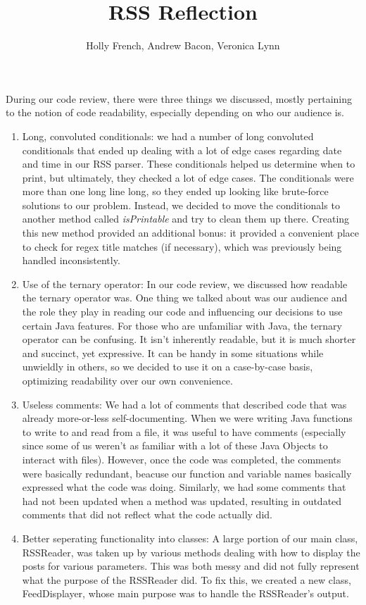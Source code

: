 \documentclass{article}
\title{RSS Reflection}
\author{Holly French, Andrew Bacon, Veronica Lynn}
\date{}
\begin{document}
\maketitle

During our code review, there were three things we discussed, mostly pertaining to the notion of code readability, especially depending on who our audience is.  

\begin{enumerate}
\item Long, convoluted conditionals: we had a number of long convoluted conditionals that ended up dealing with a lot of edge cases regarding date and time in our RSS parser.  These conditionals helped us determine when to print, but ultimately, they checked a lot of edge cases.  The conditionals were more than one long line long, so they ended up looking like brute-force solutions to our problem.  Instead, we decided to move the conditionals to another method called \emph{isPrintable} and try to clean them up there. Creating this new method provided an additional bonus: it provided a convenient place to check for regex title matches (if necessary), which was previously being handled inconsistently.
\item Use of the ternary operator: In our code review, we discussed how readable the ternary operator was.  One thing we talked about was our audience and the role they play in reading our code and influencing our decisions to use certain Java features. For those who are unfamiliar with Java, the ternary operator can be confusing. It isn't inherently readable, but it is much shorter and succinct, yet expressive. It can be handy in some situations while unwieldly in others, so we decided to use it on a case-by-case basis, optimizing readability over our own convenience.
\item Useless comments: We had a lot of comments that described code that was already more-or-less self-documenting.  When we were writing Java functions to write to and read from a file, it was useful to have comments (especially since some of us weren't as familiar with a lot of these Java Objects to interact with files).  However, once the code was completed, the comments were basically redundant, beacuse our function and variable names basically expressed what the code was doing. Similarly, we had some comments that had not been updated when a method was updated, resulting in outdated comments that did not reflect what the code actually did.
\item Better seperating functionality into classes: A large portion of our main class, RSSReader, was taken up by various methods dealing with how to display the posts for various parameters. This was both messy and did not fully represent what the purpose of the RSSReader did. To fix this, we created a new class, FeedDisplayer, whose main purpose was to handle the RSSReader's output.

\end{enumerate}
\end{document}
